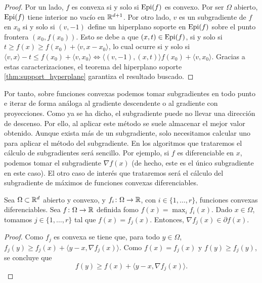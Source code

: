 \begin{proof}
    Por un lado, $f$ es convexa si y solo si $\operatorname{Epi}(f)$ es convexo. Por ser $\Omega$ abierto, $\operatorname{Epi}(f)$ tiene interior no vacío en $\mathbb{R}^{d+1}$. Por otro lado, $v$ es un subgradiente de $f$ en $x_0$ si y solo si $(v,-1)$ define un hiperplano soporte en $\operatorname{Epi}(f)$ sobre el punto frontera $(x_0,f(x_0))$. Esto se debe a que $(x,t) \in \operatorname{Epi}(f)$, si y solo si $t \ge f(x) \ge f(x_0) + \langle v, x - x_0 \rangle$, lo cual ocurre si y solo si $\langle v,x \rangle - t \le f(x_0) + \langle v, x_0 \rangle \iff \langle (v,-1),(x,t) \rangle f(x_0) + \langle v,x_0 \rangle$. Gracias a estas caracterizaciones, el teorema del hiperplano soporte \ref{thm:support_hyperplane} garantiza el resultado buscado.
\end{proof}

Por tanto, sobre funciones convexas podemos tomar subgradientes en todo punto e iterar de forma análoga al gradiente descendente o al gradiente con proyecciones. Como ya se ha dicho, el subgradiente puede no llevar una dirección de descenso. Por ello, al aplicar este método se suele almacenar el mejor valor obtenido. Aunque exista más de un subgradiente, solo necesitamos calcular uno para aplicar el método del subgradiente. En los algoritmos que trataremos el cálculo de subgradientes será sencillo. Por ejemplo, si $f$ es diferenciable en $x$, podemos tomar el subgradiente $\nabla f(x)$ (de hecho, este es el único subgradiente en este caso). El otro caso de interés que trataremos será el cálculo del subgradiente de máximos de funciones convexas diferenciables.

\begin{prop}
    Sea $\Omega \subset \mathbb{R}^d$ abierto y convexo, y $f_i\colon \Omega \to \mathbb{R}$, con $i\in \{1,\dots,r\}$, funciones convexas diferenciables. Sea $f \colon \Omega \to \mathbb{R}$ definida fomo $f(x) = \max_i f_i(x)$. Dado $x \in \Omega$, tomamos $j \in \{1,\dots,r\}$ tal que $f(x) = f_j(x)$. Entonces, $\nabla f_j(x) \in \partial f(x)$.
\end{prop}

\begin{proof}
    Como $f_j$ es convexa se tiene que, para todo $y \in \Omega$, $f_j(y) \ge f_j(x) + \langle y-x, \nabla f_j(x) \rangle$. Como $f(x) = f_j(x)$ y $f(y) \ge f_j(y)$, se concluye que
    \[ f(y) \ge f(x) + \langle y-x, \nabla f_j(x) \rangle. \]
\end{proof}